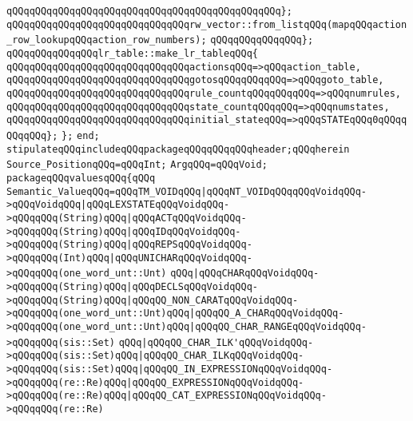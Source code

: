 \verb|qQQqqQQqqQQqqQQqqQQqqQQqqQQqqQQqqQQqqQQqqQQqqQQq};|\newline
\newline
\verb|qQQqqQQqqQQqqQQqqQQqqQQqqQQqqQQqrw_vector::from_listqQQq(mapqQQqaction_row_lookupqQQqaction_row_numbers);|\newline
\verb|qQQqqQQqqQQqqQQq};|\newline
\newline
\verb|qQQqqQQqqQQqqQQqlr_table::make_lr_tableqQQq{|\newline
\verb|qQQqqQQqqQQqqQQqqQQqqQQqqQQqqQQqactionsqQQq=>qQQqaction_table,|\newline
\verb|qQQqqQQqqQQqqQQqqQQqqQQqqQQqqQQqgotosqQQqqQQqqQQq=>qQQqgoto_table,|\newline
\verb|qQQqqQQqqQQqqQQqqQQqqQQqqQQqqQQqrule_countqQQqqQQqqQQq=>qQQqnumrules,|\newline
\verb|qQQqqQQqqQQqqQQqqQQqqQQqqQQqqQQqstate_countqQQqqQQq=>qQQqnumstates,|\newline
\verb|qQQqqQQqqQQqqQQqqQQqqQQqqQQqqQQqinitial_stateqQQq=>qQQqSTATEqQQq0qQQqqQQqqQQq};|\newline
\verb|};|\newline
\verb|end;|\newline
\verb|stipulateqQQqincludeqQQqpackageqQQqqQQqqQQqheader;qQQqherein|\newline
\verb|Source_PositionqQQq=qQQqInt;|\newline
\verb|ArgqQQq=qQQqVoid;|\newline
\verb|packageqQQqvaluesqQQq{qQQq|\newline
\verb|Semantic_ValueqQQq=qQQqTM_VOIDqQQq|\verb#|qQQqNT_VOIDqQQqqQQqVoidqQQq->qQQqVoidqQQq|qQQqLEXSTATEqQQqVoidqQQq->qQQqqQQq(String)qQQq|qQQqACTqQQqVoidqQQq->qQQqqQQq(String)qQQq|qQQqIDqQQqVoidqQQq->qQQqqQQq(String)qQQq|qQQqREPSqQQqVoidqQQq->qQQqqQQq(Int)qQQq|qQQqUNICHARqQQqVoidqQQq->qQQqqQQq(one_word_unt::Unt)#\newline
\verb|qQQq|\verb#|qQQqCHARqQQqVoidqQQq->qQQqqQQq(String)qQQq|qQQqDECLSqQQqVoidqQQq->qQQqqQQq(String)qQQq|qQQqQQ_NON_CARATqQQqVoidqQQq->qQQqqQQq(one_word_unt::Unt)qQQq|qQQqQQ_A_CHARqQQqVoidqQQq->qQQqqQQq(one_word_unt::Unt)qQQq|qQQqQQ_CHAR_RANGEqQQqVoidqQQq->qQQqqQQq(sis::Set)#\newline
\verb|qQQq|\verb#|qQQqQQ_CHAR_ILK'qQQqVoidqQQq->qQQqqQQq(sis::Set)qQQq|qQQqQQ_CHAR_ILKqQQqVoidqQQq->qQQqqQQq(sis::Set)qQQq|qQQqQQ_IN_EXPRESSIONqQQqVoidqQQq->qQQqqQQq(re::Re)qQQq|qQQqQQ_EXPRESSIONqQQqVoidqQQq->qQQqqQQq(re::Re)qQQq|qQQqQQ_CAT_EXPRESSIONqQQqVoidqQQq->qQQqqQQq(re::Re)#\newline
